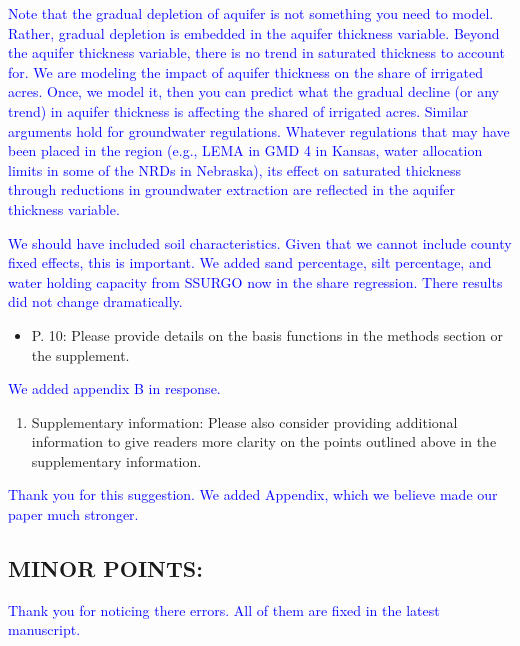 \documentclass[
]{article}
\providecommand{\tightlist}{%
  \setlength{\itemsep}{0pt}\setlength{\parskip}{0pt}}
\begin{document}
\textcolor{blue}{Note that the gradual depletion of aquifer is not something you need to model. Rather, gradual depletion is embedded in the aquifer thickness variable. Beyond the aquifer thickness variable, there is no trend in saturated thickness to account for. We are modeling the impact of aquifer thickness on the share of irrigated acres. Once, we model it, then you can predict what the gradual decline (or any trend) in aquifer thickness is affecting the shared of irrigated acres. Similar arguments hold for groundwater regulations. Whatever regulations that may have been placed in the region (e.g., LEMA in GMD 4 in Kansas, water allocation limits in some of the NRDs in Nebraska), its effect on saturated thickness through reductions in groundwater extraction are reflected in the aquifer thickness variable.}

\textcolor{blue}{We should have included soil characteristics. Given that we cannot include county fixed effects, this is important. We added sand percentage, silt percentage, and water holding capacity from SSURGO now in the share regression. There results did not change dramatically. }

\begin{itemize}
\tightlist
\item
  P. 10: Please provide details on the basis functions in the methods
  section or the supplement.
\end{itemize}

\textcolor{blue}{We added appendix B in response.}

\begin{enumerate}
\def\labelenumi{\arabic{enumi}.}
\setcounter{enumi}{7}
\tightlist
\item
  Supplementary information: Please also consider providing additional
  information to give readers more clarity on the points outlined above
  in the supplementary information.
\end{enumerate}

\textcolor{blue}{Thank you for this suggestion. We added Appendix, which we believe made our paper much stronger.}

\hypertarget{minor-points}{%
\subsection{MINOR POINTS:}\label{minor-points}}

\textcolor{blue}{Thank you for noticing there errors. All of them are fixed in the latest manuscript.}
\end{document}
